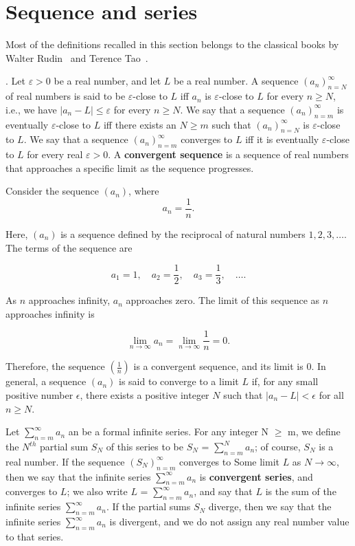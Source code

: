 \newpage
\section{Sequence and series }
Most of the definitions recalled in this section belongs to the classical books by Walter Rudin~\cite{rudin1976} and Terence Tao~\cite{teretaobook}. 
\begin{definition}.
 Let $\varepsilon>0$ be a real number, and let $L$ be a real number. A sequence $\left(a_n\right)_{n=N}^{\infty}$ of real numbers is said to be $\varepsilon$-close to $L$ iff $a_n$ is $\varepsilon$-close to $L$ for every $n \geq N$, i.e., we have $\left|a_n-L\right| \leq \varepsilon$ for every $n \geq N$. We say that a sequence $\left(a_n\right)_{n=m}^{\infty}$ is eventually $\varepsilon$-close to $L$ iff there exists an $N \geq m$ such that $\left(a_n\right)_{n=N}^{\infty}$ is $\varepsilon$-close to $L$. We say that a sequence $\left(a_n\right)_{n=m}^{\infty}$ converges to $L$ iff it is eventually $\varepsilon$-close to $L$ for every real $\varepsilon>0$. 
 A \textbf{convergent sequence} is a sequence of real numbers that approaches a specific limit as the sequence progresses.
\end{definition}


 \begin{example} 
 Consider the sequence $(a_n)$, where
\[ a_n = \frac{1}{n}. \]

Here, $(a_n)$ is a sequence defined by the reciprocal of natural numbers $1, 2, 3, \ldots$. The terms of the sequence are

\[ a_1 = 1, \quad a_2 = \frac{1}{2}, \quad a_3 = \frac{1}{3}, \quad \ldots. \]

As \( n \) approaches infinity, \( a_n \) approaches zero. The limit of this sequence as \( n \) approaches infinity is

\[ \lim_{n \to \infty} a_n = \lim_{n \to \infty} \frac{1}{n} = 0. \]

Therefore, the sequence $(\frac{1}{n})$ is a convergent sequence, and its limit is 0. In general, a sequence $(a_n)$ is said to converge to a limit \( L \) if, for any small positive number \( \epsilon \), there exists a positive integer \( N \) such that \( |a_n - L| < \epsilon \) for all \( n \geq N \).

 \end{example}
 \begin{definition}
Let $\sum_{n=m}^{\infty} a_n $ an be a formal infinite series. For any integer N $\geq$ m, we define the $N^{th}$ partial sum $S_N$ of this series to be $S_N$ = $\sum_{n = m}^{N} a_n $; of course, $S_N$ is a real number. If the sequence $( S_N )_{n = m} ^\infty$ converges to Some 
limit $L$ as $ N \to\infty$, then we say that the infinite series $\sum_{n=m}^{\infty} a_n $  is \textbf{convergent series}, and converges to $L$; we also write $L$ = $\sum_{n=m}^{\infty} a_n $, and say that $L$ is the sum of the infinite series $\sum_{n=m}^{\infty} a_n $. If the partial sums $S_N$ diverge, then we say that the infinite series $\sum_{n=m}^{\infty} a_n $ is divergent, and we do not assign any real number value to that series.
 \end{definition}
  
